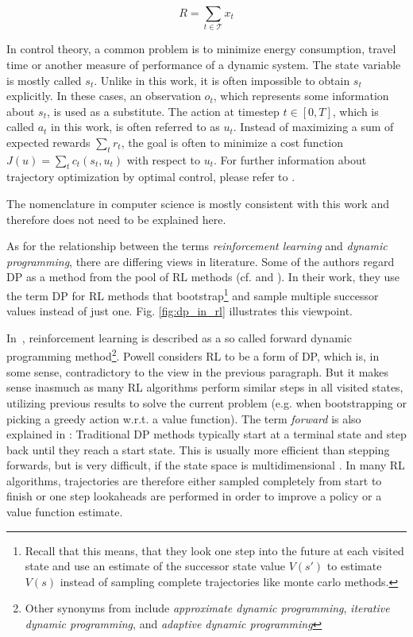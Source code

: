 \begin{equation}
R = \sum_{t\in\mathcal{T}} x_t
\label{eq:finance_resources}
\end{equation}

In control theory, a common problem is to minimize energy consumption, travel time or another measure of performance of a dynamic system. The state variable is mostly called $s_t$. Unlike in this work, it is often impossible to obtain $s_t$ explicitly. In these cases, an observation $o_t$, which represents some information about $s_t$, is used as a substitute. The action at timestep $t\in[0,T]$, which is called $a_t$ in this work, is often referred to as $u_t$. Instead of maximizing a sum of expected rewards $\sum_t r_t$, the goal is often to minimize a cost function $J(u)=\sum_t c_t(s_t,u_t)$ with respect to $u_t$. For further information about trajectory optimization by optimal control, please refer to \cite{grimm2004}.

The nomenclature in computer science is mostly consistent with this work and therefore does not need to be explained here.

As for the relationship between the terms \textit{reinforcement learning} and \textit{dynamic programming}, there are differing views in literature. Some of the authors regard DP as a method from the pool of RL methods (cf. \cite{Silver2015} and \cite{SuttonBarto2018}). In their work, they use the term DP for RL methods that bootstrap\footnote{Recall that this means, that they look one step into the future at each visited state and use an estimate of the successor state value $V(s')$ to estimate $V(s)$ instead of sampling complete trajectories like monte carlo methods.} and sample multiple successor values instead of just one. Fig. \ref{fig:dp_in_rl} illustrates this viewpoint.

In~\cite{Powell2007ADP}, reinforcement learning is described as a so called forward dynamic programming method\footnote{Other synonyms from \cite{Powell2007ADP} include \textit{approximate dynamic programming}, \textit{iterative dynamic programming}, and \textit{adaptive dynamic programming}}. Powell considers RL to be a form of DP, which is, in some sense, contradictory to the view in the previous paragraph. But it makes sense inasmuch as many RL algorithms perform similar steps in all visited states, utilizing previous results to solve the current problem (e.g. when bootstrapping or picking a greedy action w.r.t. a value function). The term \textit{forward} is also explained in \cite{Powell2007ADP}: Traditional DP methods typically start at a terminal state and step back until they reach a start state. This is usually more efficient than stepping forwards, but is very difficult, if the state space is multidimensional \cite[section~1.5]{Powell2007ADP}. In many RL algorithms, trajectories are therefore either sampled completely from start to finish or one step lookaheads are performed in order to improve a policy or a value function estimate.

